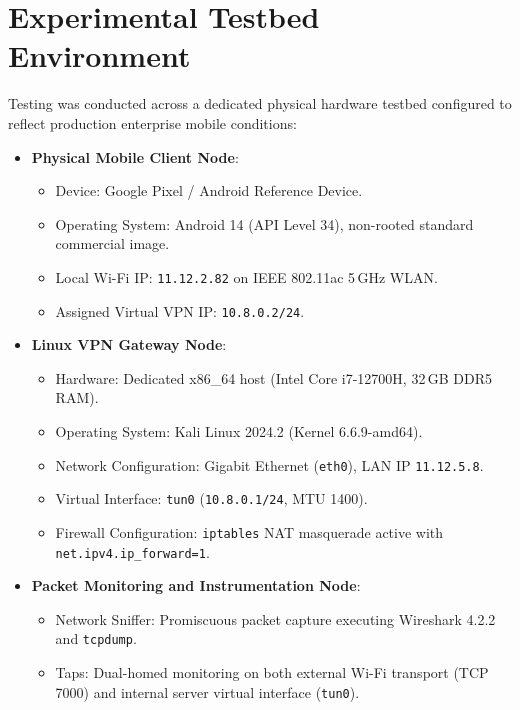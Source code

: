 \section{Experimental Testbed Environment}
\label{sec:testbed_environment}

Testing was conducted across a dedicated physical hardware testbed configured to reflect production enterprise mobile conditions:

\begin{itemize}
    \item \textbf{Physical Mobile Client Node}:
    \begin{itemize}
        \item Device: Google Pixel / Android Reference Device.
        \item Operating System: Android 14 (API Level 34), non-rooted standard commercial image.
        \item Local Wi-Fi IP: \texttt{11.12.2.82} on IEEE 802.11ac 5\,GHz WLAN.
        \item Assigned Virtual VPN IP: \texttt{10.8.0.2/24}.
    \end{itemize}
    \item \textbf{Linux VPN Gateway Node}:
    \begin{itemize}
        \item Hardware: Dedicated x86\_64 host (Intel Core i7-12700H, 32\,GB DDR5 RAM).
        \item Operating System: Kali Linux 2024.2 (Kernel 6.6.9-amd64).
        \item Network Configuration: Gigabit Ethernet (\texttt{eth0}), LAN IP \texttt{11.12.5.8}.
        \item Virtual Interface: \texttt{tun0} (\texttt{10.8.0.1/24}, MTU 1400).
        \item Firewall Configuration: \texttt{iptables} NAT masquerade active with \texttt{net.ipv4.ip\_forward=1}.
    \end{itemize}
    \item \textbf{Packet Monitoring and Instrumentation Node}:
    \begin{itemize}
        \item Network Sniffer: Promiscuous packet capture executing Wireshark 4.2.2 and \texttt{tcpdump}.
        \item Taps: Dual-homed monitoring on both external Wi-Fi transport (TCP 7000) and internal server virtual interface (\texttt{tun0}).
    \end{itemize}
\end{itemize}

